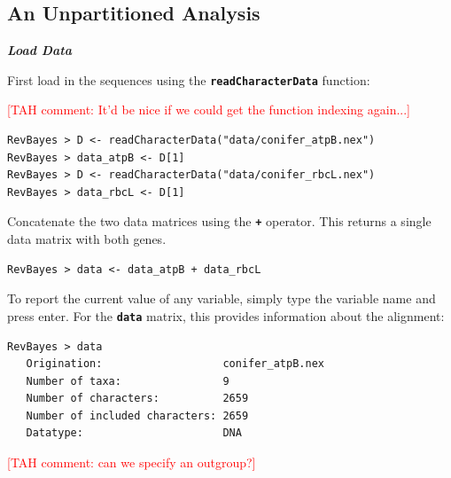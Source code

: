 \documentclass[11pt]{article}
\newcommand{\taha}[1]{{\textcolor{red}{[TAH comment: #1]}}} %
\newcommand{\cl}[1]{{\texttt{\textbf{#1}}}}
\newcommand{\mbcl}[1]{\exs{\cl{MrBayes > {#1}}}}
\begin{document}



\bigskip
\subsection{An Unpartitioned Analysis}\label{secUnif} 

\textbf{\textit{Load Data}}

First load in the sequences using the \cl{readCharacterData} function:

\taha{It'd be nice if we could get the function indexing again...}
{\tt \begin{snugshade*}
\begin{lstlisting}
RevBayes > D <- readCharacterData("data/conifer_atpB.nex")
RevBayes > data_atpB <- D[1]
RevBayes > D <- readCharacterData("data/conifer_rbcL.nex")
RevBayes > data_rbcL <- D[1]
\end{lstlisting}
\end{snugshade*}}

Concatenate the two data matrices using the \cl{+} operator. This returns a single data matrix with both genes.

{\tt \begin{snugshade*}
\begin{lstlisting}
RevBayes > data <- data_atpB + data_rbcL
\end{lstlisting}
\end{snugshade*}}

To report the current value of any variable, simply type the variable name and press enter. For the \cl{data} matrix, this provides information about the alignment:

{\tt \begin{snugshade*}
\begin{lstlisting}
RevBayes > data
   Origination:                   conifer_atpB.nex
   Number of taxa:                9
   Number of characters:          2659
   Number of included characters: 2659
   Datatype:                      DNA
\end{lstlisting}
\end{snugshade*}}

\taha{can we specify an outgroup?}

\end{document}
